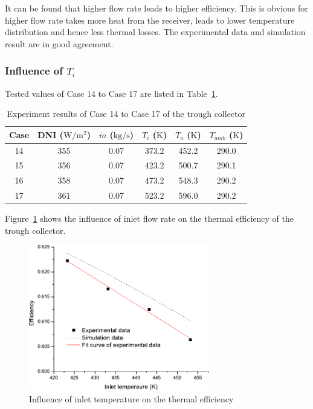 It can be found that higher flow rate leads to higher efficiency. This is obvious for higher flow rate takes more heat from the receiver, leads to lower temperature distribution and hence less thermal losses. The experimental data and simulation result are in good agreement.

\subsubsection{Influence of $T_i$}
Tested values of Case 14 to Case 17 are listed in Table~\ref{tab:ResultOfDish3}.

\begin{table}[htbp]\footnotesize
	\caption{Experiment results of Case 14 to Case 17 of the trough collector}
	\begin{center}
	\begin{tabular}{cccccc}
		\toprule
		Case	& DNI ($\mathrm{W/m^2}$)	&	$\dot{m}$ ($\mathrm{kg/s}$)			&	$T_i$ ($\mathrm{K}$)	&	$T_o$ ($\mathrm{K}$)		&	$T_{amb}$ ($\mathrm{K}$)\\
		\midrule
		14	&	355	&	0.07	&	373.2	&	452.2	&	290.0\\
		15	&	356	&	0.07	&	423.2	&	500.7	&	290.1\\
		16	&	358	&	0.07	&	473.2	&	548.3	&	290.2	\\
		17	&	361	&	0.07	&	523.2	&	596.0	&	290.2\\
		\bottomrule
	\end{tabular}
	\end{center}
	\label{tab:ResultOfDish3}
\end{table}

Figure~\ref{fig:T_i-eta-trough} shows the influence of inlet flow rate on the thermal efficiency of the trough collector.
\begin{figure}[!ht]
\centering
\includegraphics[width=0.7\textwidth]{fig/T_i-eta-trough}
\caption{Influence of inlet temperature on the thermal efficiency}
\label{fig:T_i-eta-trough}
\end{figure}

